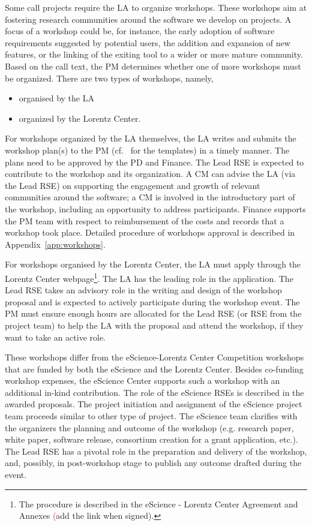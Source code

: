 Some call projects require the LA to organize workshops. These workshops aim at fostering research communities around
the software we develop on projects. A focus of a workshop could be, for instance, the early adoption of software
requirements suggested by potential users, the addition and expansion of new features, or the linking of the exiting
tool to a wider or more mature community. Based on the call text, the PM determines whether one of more workshops must
be organized. There are two types of workshops, namely,
\begin{itemize}
\item organised by the LA
\item organized by the Lorentz Center.
\end{itemize}

For workshops organized by the LA themselves, the LA writes and submits the workshop plan(s) to the PM (cf.~\cite{proj-templates} 
for the templates) in a timely manner. The plans need to be approved by the PD and Finance. The
Lead RSE is expected to contribute to the workshop and its organization. A CM can advise the LA (via the Lead RSE) on
supporting the engagement and growth of relevant communities around the software; a CM is involved in the introductory
part of the workshop, including an opportunity to address participants. Finance supports the PM team with respect to
reimbursement of the costs and records that a workshop took place. Detailed procedure of workshops approval is
described in Appendix~\ref{app:workshops}.

For workshops organised by the Lorentz Center, the LA must apply through the Lorentz Center webpage\footnote{The
procedure is described in the eScience - Lorentz Center Agreement and Annexes {\textcolor{red}(add the link when signed)}.}.
%
The LA has the leading role in the application. The Lead RSE takes an advisory role in the writing and design of the
workshop proposal and is expected to actively participate during the workshop event. The PM must ensure enough hours
are allocated for the Lead RSE (or RSE from the project team) to help the LA with the proposal and attend the workshop,
if they want to take an active role.

These workshops differ from the eScience-Lorentz Center Competition workshops that are funded by both the eScience and
the Lorentz Center. Besides co-funding workshop expenses, the eScience Center supports such a workshop with an
additional in-kind contribution. The role of the eScience RSEs is described in the awarded proposals. The project
initiation and assignment of the eScience project team proceeds similar to other type of project. The eScience team
clarifies with the organizers the planning and outcome of the workshop (e.g. research paper, white paper, software
release, consortium creation for a grant application, etc.). The Lead RSE has a pivotal role in the preparation and
delivery of the workshop, and, possibly, in post-workshop stage to publish any outcome drafted during the event. 

